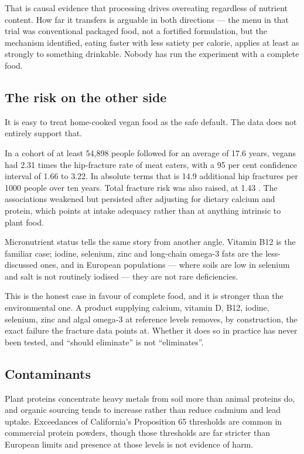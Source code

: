\documentclass[11pt,a4paper]{article}
\begin{document}
That is causal evidence that processing drives overeating regardless of nutrient
content. How far it transfers is arguable in both directions — the menu in that trial
was conventional packaged food, not a fortified formulation, but the mechanism
identified, eating faster with less satiety per calorie, applies at least as strongly
to something drinkable. Nobody has run the experiment with a complete food.

\subsection{The risk on the other side}

It is easy to treat home-cooked vegan food as the safe default. The data does not
entirely support that.

In a cohort of at least 54,898 people followed for an average of 17.6 years, vegans
had 2.31 times the hip-fracture rate of meat eaters, with a 95 per cent confidence
interval of 1.66 to 3.22. In absolute terms that is 14.9 additional hip fractures per
1000 people over ten years. Total fracture risk was also raised, at 1.43
\cite{epic-fracture}. The associations weakened but persisted after adjusting for
dietary calcium and protein, which points at intake adequacy rather than at anything
intrinsic to plant food.

Micronutrient status tells the same story from another angle. Vitamin B12 is the
familiar case; iodine, selenium, zinc and long-chain omega-3 fats are the
less-discussed ones, and in European populations — where soils are low in selenium and
salt is not routinely iodised — they are not rare deficiencies.

This is the honest case in favour of complete food, and it is stronger than the
environmental one. A product supplying calcium, vitamin D, B12, iodine, selenium, zinc
and algal omega-3 at reference levels removes, by construction, the exact failure the
fracture data points at. Whether it does so in practice has never been tested, and
\enquote{should eliminate} is not \enquote{eliminates}.

\subsection{Contaminants}

Plant proteins concentrate heavy metals from soil more than animal proteins do, and
organic sourcing tends to increase rather than reduce cadmium and lead uptake.
Exceedances of California's Proposition 65 thresholds are common in commercial protein
powders, though those thresholds are far stricter than European limits and presence at
those levels is not evidence of harm.
\end{document}
